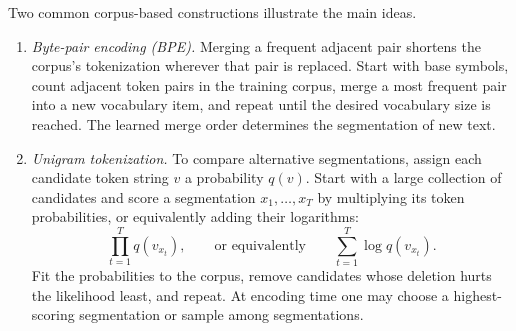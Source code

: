 \documentclass[11pt,twoside]{article}
\theoremstyle{plain}
\theoremstyle{definition}
\theoremstyle{remark}
\begin{document}
Two common corpus-based constructions illustrate the main ideas.
\begin{enumerate}[leftmargin=*]
\item \emph{Byte-pair encoding (BPE).} Merging a frequent adjacent pair
shortens the corpus's tokenization wherever that pair is replaced.
Start with base symbols, count adjacent
token pairs in the training corpus, merge a most frequent pair into a new
vocabulary item, and repeat until the desired vocabulary size is reached. The
learned merge order determines the segmentation of new text.
\item \emph{Unigram tokenization.} To compare alternative segmentations,
assign each candidate token string $v$ a probability $q(v)$.
Start with a large collection of candidates and score a segmentation
$x_1,\ldots,x_T$ by multiplying its token probabilities,
or equivalently adding their logarithms:
\begin{equation}
\prod_{t=1}^T q(v_{x_t}),
\qquad\text{or equivalently}\qquad
\sum_{t=1}^T\log q(v_{x_t}).
\end{equation}
Fit the probabilities to the corpus, remove candidates whose deletion hurts
the likelihood least, and repeat. At encoding time one may choose a
highest-scoring segmentation or sample among segmentations.
\end{enumerate}
\end{document}
